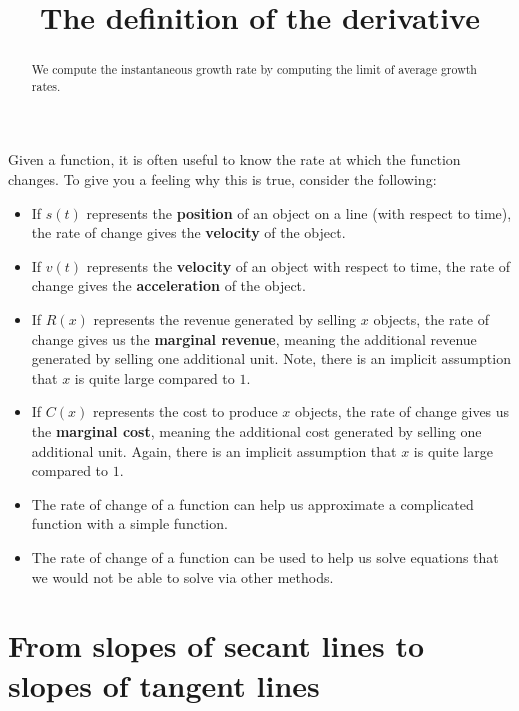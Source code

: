 \documentclass{ximera}
\title[Dig-In:]{The definition of the derivative}
\begin{document}
\begin{abstract}
We compute the instantaneous growth rate by computing the limit of
average growth rates.
\end{abstract}
\maketitle


Given a function, it is often useful to know the rate at which the
function changes. To give you a feeling why this is true, consider the
following:
\begin{itemize}
 
\item If $s(t)$ represents the \textbf{position} of an object on a line (with respect to time), the rate of change gives
  the \textbf{velocity} of the object.
\item If $v(t)$ represents the \textbf{velocity} of an object with respect to
  time, the rate of change gives the \textbf{acceleration} of the object.
\item If $R(x)$ represents the revenue generated by selling $x$
  objects, the rate of change gives us the \textbf{marginal revenue},
  meaning the additional revenue generated by selling one additional
  unit. Note, there is an implicit assumption that $x$ is quite large
  compared to $1$.
\item If $C(x)$ represents the cost to produce $x$ objects, the rate
  of change gives us the \textbf{marginal cost}, meaning the
  additional cost generated by selling one additional unit. Again,
  there is an implicit assumption that $x$ is quite large compared to
  $1$.
\item The rate of change of a function can help us approximate a
  complicated function with a simple function.
\item The rate of change of a function can be used to help us solve
  equations that we would not be able to solve via other methods.
\end{itemize}



\section{From slopes of secant lines to slopes of tangent lines}
\end{document}
